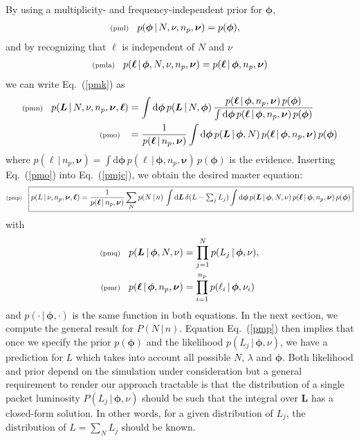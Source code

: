 \documentclass[11pt]{article}
\newcommand{\lleq}[1]{\label{#1} }
\renewcommand{\lleq}[1]{\label{#1} {\scriptstyle {\rm (#1)}} \hspace*{2ex} }
\newcommand{\cond}{\,|\,}
\newcommand{\bml}{{\bm{\ell}}}
\newcommand{\bmL}{{\bm{L}}}
\newcommand{\bmphi}{{\bm{\phi}}}
\newcommand{\bmnu}{{\bm{\nu}}}
\newcommand{\refeq}[1]{Eq.~(\ref{#1})}
\newcommand{\npack}{n_p}
\newcommand{\rmdx}[1]{\mbox{d} #1 \,} %
\begin{document}
By using a multiplicity- and frequency-independent prior for $\bmphi$,
\begin{align}
  \lleq{pml}
  p(\bmphi\cond N,\nu, \npack,\bmnu) &= p(\bmphi),
\end{align}
and by recognizing that $\bml$ is independent of $N$ and $\nu$
\begin{align}
  \lleq{pmla}
  p(\bml\cond \bmphi,N,\nu, \npack,\bmnu) = p(\bml\cond \bmphi,\npack,\bmnu)
\end{align}
we can write \refeq{pmk} as
\begin{align}
  \lleq{pmn}
  p(\bmL\cond N,\nu, \npack,\bmnu, \bml)
  &= \int \rmdx{\bmphi} p(\bmL\cond N,\bmphi)\, %
  \frac{p(\bml\cond \bmphi, \npack, \bmnu)\,p(\bmphi)} %
  {\int \rmdx{\bmphi} p(\bml\cond \bmphi,\npack,\bmnu)\,p(\bmphi)} \\
  \lleq{pmo}
  &= \frac{1}  {p(\bml\cond \npack, \bmnu)} %
  \int \rmdx{\bmphi} p(\bmL\cond \bmphi, N)\, %
  p(\bml\cond \bmphi, \npack,\bmnu)\,p(\bmphi)
\end{align}
where $p(\bml\cond \npack, \bmnu) = \int \rmdx{\bmphi} p(\bml\cond
\bmphi, \npack,\bmnu)\,p(\bmphi)$ is the evidence.  Inserting \refeq{pmo}
into \refeq{pmjc}, we obtain the desired master equation:
\begin{equation}
  \lleq{pmp}
  \boxed{
  p(L\cond \nu, \npack,\bmnu, \bml)
  = \frac{1}{p(\bml\cond \npack, \bmnu)}
  \sum_N p(N\cond n)\,\int \rmdx{\bmL} \delta(L - \textstyle\sum_j L_j)
  \displaystyle\int \rmdx{\bmphi} p(\bmL\cond \bmphi, N, \nu) \, p(\bml\cond \bmphi,\npack,\bmnu)
  \, p(\bmphi)
  }
\end{equation}
with
\begin{align}
  \lleq{pmq}
  p(\bmL\cond \bmphi, N, \nu) &= \prod_{j=1}^N p(L_j\cond \bmphi, \nu), \\
  \lleq{pmr}
  p(\bml\cond \bmphi,\npack,\bmnu) &= \prod_{i=1}^{\npack} p(\ell_i\cond \bmphi, \nu_i)
\end{align}
and $p(\cdot \cond \bmphi, \cdot)$ is the same function in both
equations.  In the next section, we compute the general result for
$P(N \cond n)$. Equation \refeq{pmp} then implies that once we specify
the prior $p(\bmphi)$ and the likelihood $p(L_j\cond \bmphi, \nu)$, we
have a prediction for $L$ which takes into account all possible $N$,
$\lambda$ and $\bmphi$. Both likelihood and prior depend on the
simulation under consideration but a general requirement to render our
approach tractable is that the distribution of a single packet
luminosity $P(L_j \cond \bmphi, \nu)$ should be such that the integral
over $\bmL$ has a closed-form solution. In other words, for a given
distribution of $L_j$, the distribution of $L = \sum_N L_j$ should be
known.
\end{document}
